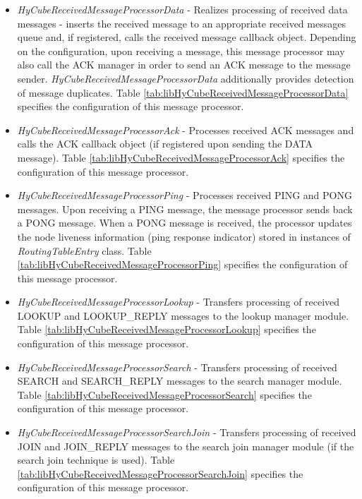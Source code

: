 \begin{itemize}
	\renewcommand{\labelitemi}{$\bullet$}
	
	\item \emph{HyCubeReceivedMessageProcessorData} - Realizes processing of received data messages - inserts the received message to an appropriate received messages queue and, if registered, calls the received message callback object. Depending on the configuration, upon receiving a message, this message processor may also call the ACK manager in order to send an ACK message to the message sender. \emph{HyCubeReceivedMessageProcessorData} additionally provides detection of message duplicates. Table \ref{tab:libHyCubeReceivedMessageProcessorData} specifies the configuration of this message processor.

	\item \emph{HyCubeReceivedMessageProcessorAck} - Processes received ACK messages and calls the ACK callback object (if registered upon sending the DATA message). Table \ref{tab:libHyCubeReceivedMessageProcessorAck} specifies the configuration of this message processor.
	
	\item \emph{HyCubeReceivedMessageProcessorPing} - Processes received PING and PONG messages. Upon receiving a PING message, the message processor sends back a PONG message. When a PONG message is received, the processor updates the node liveness information (ping response indicator) stored in instances of \emph{RoutingTableEntry} class. Table \ref{tab:libHyCubeReceivedMessageProcessorPing} specifies the configuration of this message processor.
	
	
	
	\item \emph{HyCubeReceivedMessageProcessorLookup} - Transfers processing of received LOOKUP and LOOKUP\_REPLY messages to the lookup manager module. Table \ref{tab:libHyCubeReceivedMessageProcessorLookup} specifies the configuration of this message processor.
	
	\item \emph{HyCubeReceivedMessageProcessorSearch} - Transfers processing of received SEARCH and SEARCH\_REPLY messages to the search manager module. Table \ref{tab:libHyCubeReceivedMessageProcessorSearch} specifies the configuration of this message processor.
	
	\item \emph{HyCubeReceivedMessageProcessorSearchJoin} - Transfers processing of received JOIN and JOIN\_REPLY messages to the search join manager module (if the search join technique is used). Table \ref{tab:libHyCubeReceivedMessageProcessorSearchJoin} specifies the configuration of this message processor.
	

\end{itemize}
